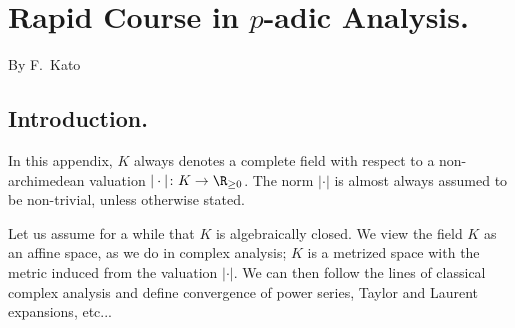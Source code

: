 \appendix
{}

\chapter{Rapid Course in $p$-adic Analysis.}\label{app:rapid}
\renewcommand{\thechapter}{\Alph{chapter}}

\vspace{1ex}
\begin{center}
By {\sc F.\ Kato}
\end{center}

%
\section{Introduction.}
%

In this appendix, $K$ always denotes a complete field 
with respect to a non-archimedean valuation $|\cdot|\colon K\rightarrow
\R_{\geq 0}$.
The norm $|\cdot|$ is almost always assumed to be non-trivial, unless
otherwise stated.

Let us assume for a while that $K$ is algebraically closed.
We view the field $K$ as an affine space, as we do in complex analysis; 
$K$ is a metrized space with the metric induced from the
valuation $|\cdot|$.
We can then follow the lines of classical complex analysis and define
convergence of power series, Taylor and Laurent
expansions, etc...
%

